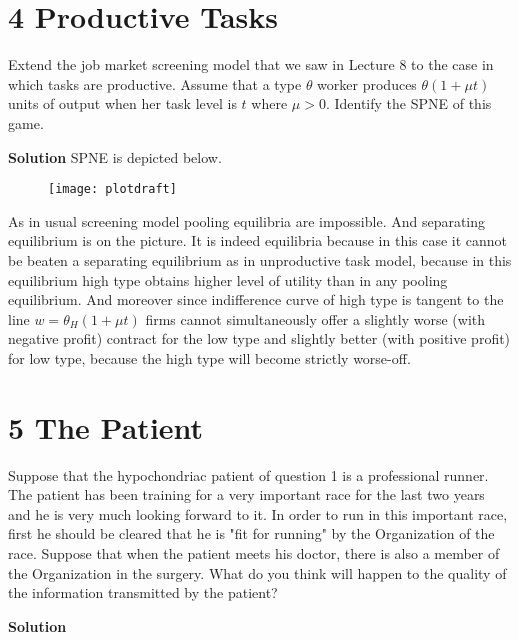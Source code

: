 \documentclass[a4paper]{article}
\begin{document}
\section*{4 Productive Tasks}
	Extend the job market screening model that we saw in Lecture 8 to the case in which
	tasks are productive. Assume that a type $\theta$ worker produces $\theta(1 + \mu t)$ units of output
	when her task level is $t$ where $\mu > 0$.
	Identify the SPNE of this game.
	
	
	\textbf{Solution}
	SPNE is depicted below.
	\begin{figure}[H]
		\centering
		\texttt{[image: plotdraft]}
		\caption{}\label{fig4}
	\end{figure}
	As in usual screening model pooling equilibria are impossible. And separating equilibrium is on the picture. It is indeed equilibria because in this case it cannot be beaten a separating equilibrium as in unproductive task model, because in this equilibrium high type obtains higher level of utility than in any pooling equilibrium. And moreover since indifference curve of high type is tangent to the line $w = \theta_H(1 + \mu t)$ firms cannot simultaneously offer a slightly worse (with negative profit) contract for the low type and slightly better (with positive profit) for low type, because the high type will become strictly worse-off.
	
	
	\section*{5 The Patient}
		Suppose that the hypochondriac patient of question 1 is a professional runner. The
		patient has been training for a very important race for the last two years and he is very
		much looking forward to it. In order to run in this important race, first he should be
		cleared that he is "fit for running" by the Organization of the race. Suppose that when
		the patient meets his doctor, there is also a member of the Organization in the surgery.
		What do you think will happen to the quality of the information transmitted by the
		patient?
		
		
		\textbf{Solution}
		
\end{document}
